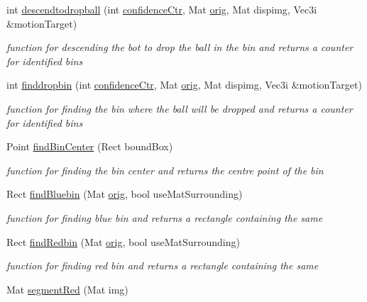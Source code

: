 \begin{DoxyCompactItemize}
int \hyperlink{classBinsTask_ad6bc9c1bb7dfe3a0eba2c12daf9b8251}{descendtodropball} (int \hyperlink{BinsTask_8cpp_ac559c47f5c7d297de44ad8e157f30eec}{confidence\+Ctr}, Mat \hyperlink{classBinsTask_aedf5f6032dcea5fbab09caed34cf80ac}{orig}, Mat dispimg, Vec3i \&motion\+Target)
\begin{DoxyCompactList}\small\item\em function for descending the bot to drop the ball in the bin and returns a counter for identified bins \end{DoxyCompactList}\item 
int \hyperlink{classBinsTask_a9d4fa38c0a887e585584a58d9c89d588}{finddropbin} (int \hyperlink{BinsTask_8cpp_ac559c47f5c7d297de44ad8e157f30eec}{confidence\+Ctr}, Mat \hyperlink{classBinsTask_aedf5f6032dcea5fbab09caed34cf80ac}{orig}, Mat dispimg, Vec3i \&motion\+Target)
\begin{DoxyCompactList}\small\item\em function for finding the bin where the ball will be dropped and returns a counter for identified bins \end{DoxyCompactList}\item 
Point \hyperlink{classBinsTask_ae9a46f2485c946548ec25d19967bdd82}{find\+Bin\+Center} (Rect bound\+Box)
\begin{DoxyCompactList}\small\item\em function for finding the bin center and returns the centre point of the bin \end{DoxyCompactList}\item 
Rect \hyperlink{classBinsTask_a759535380ae45df16970bed852d95531}{find\+Bluebin} (Mat \hyperlink{classBinsTask_aedf5f6032dcea5fbab09caed34cf80ac}{orig}, bool use\+Mat\+Surrounding)
\begin{DoxyCompactList}\small\item\em function for finding blue bin and returns a rectangle containing the same \end{DoxyCompactList}\item 
Rect \hyperlink{classBinsTask_a9d0f57751e1cf8ce9ed4ea831d326616}{find\+Redbin} (Mat \hyperlink{classBinsTask_aedf5f6032dcea5fbab09caed34cf80ac}{orig}, bool use\+Mat\+Surrounding)
\begin{DoxyCompactList}\small\item\em function for finding red bin and returns a rectangle containing the same \end{DoxyCompactList}\item 
Mat \hyperlink{classBinsTask_af47b3fa7a02c4dc69641894331773efc}{segment\+Red} (Mat img)

\end{DoxyCompactItemize}
